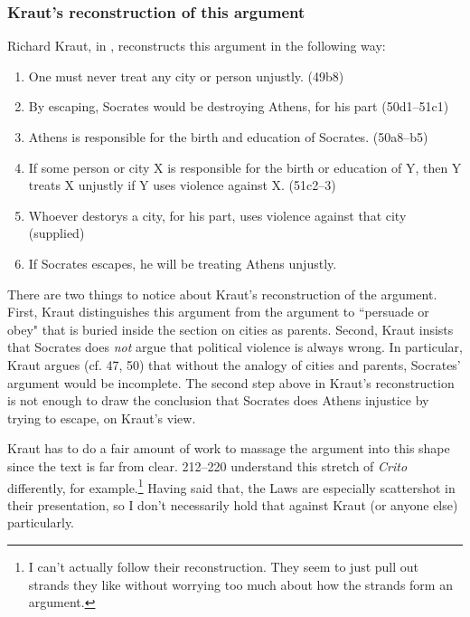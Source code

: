 \documentclass[12pt,letterpaper]{article}
\begin{document}
\subsubsection*{Kraut's reconstruction of this argument}

Richard Kraut, in \cite{kraut1984}, reconstructs this argument in the following way:

\begin{enumerate}

    \item One must never treat any city or person unjustly. (49b8)

    \item By escaping, Socrates would be destroying Athens, for his part (50d1--51c1)

    \item Athens is responsible for the birth and education of Socrates. (50a8--b5)

    \item If some person or city X is responsible for the birth or education of Y, then Y treats X unjustly if Y uses violence against X. (51c2--3)

    \item Whoever destorys a city, for his part, uses violence against that city (supplied)

    \item If Socrates escapes, he will be treating Athens unjustly.

\end{enumerate}

There are two things to notice about Kraut's reconstruction of the argument. First, Kraut distinguishes this argument from the argument to ``persuade or obey" that is buried inside the section on cities as parents. Second, Kraut insists that Socrates does \emph{not} argue that political violence is always wrong. In particular, Kraut argues (cf. 47, 50) that without the analogy of cities and parents, Socrates' argument would be incomplete. The second step above in Kraut's reconstruction is not enough to draw the conclusion that Socrates does Athens injustice by trying to escape, on Kraut's view.

Kraut has to do a fair amount of work to massage the argument into this shape since the text is far from clear. \cite{brickhouse-smith2004-plato-trial-of-socrates} 212--220 understand this stretch of \textit{Crito} differently, for example.\footnote{I can't actually follow their reconstruction. They seem to just pull out strands they like without worrying too much about how the strands form an argument.}  Having said that, the Laws are especially scattershot in their presentation, so I don't necessarily hold that against Kraut (or anyone else) particularly.
\end{document}
